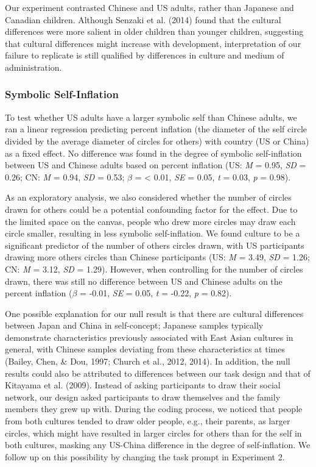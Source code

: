 \documentclass[
  man,floatsintext]{apa6}
\begin{document}
Our experiment contrasted Chinese and US adults, rather than Japanese and Canadian children. Although Senzaki et al. (2014) found that the cultural differences were more salient in older children than younger children, suggesting that cultural differences might increase with development, interpretation of our failure to replicate is still qualified by differences in culture and medium of administration.

\hypertarget{symbolic-self-inflation-1}{%
\subsubsection{Symbolic Self-Inflation}\label{symbolic-self-inflation-1}}

To test whether US adults have a larger symbolic self than Chinese adults, we ran a linear regression predicting percent inflation (the diameter of the self circle divided by the average diameter of circles for others) with country (US or China) as a fixed effect. No difference was found in the degree of symbolic self-inflation between US and Chinese adults based on percent inflation (US: \emph{M} = 0.95, \emph{SD} = 0.26; CN: \emph{M} = 0.94, \emph{SD} = 0.53; \(\beta\) = \textless{} 0.01, \emph{SE} = 0.05, \emph{t} = 0.03, \emph{p} = 0.98).

As an exploratory analysis, we also considered whether the number of circles drawn for others could be a potential confounding factor for the effect. Due to the limited space on the canvas, people who drew more circles may draw each circle smaller, resulting in less symbolic self-inflation. We found culture to be a significant predictor of the number of others circles drawn, with US participants drawing more others circles than Chinese participants (US: \emph{M} = 3.49, \emph{SD} = 1.26; CN: \emph{M} = 3.12, \emph{SD} = 1.29). However, when controlling for the number of circles drawn, there was still no difference between US and Chinese adults on the percent inflation (\(\beta\) = -0.01, \emph{SE} = 0.05, \emph{t} = -0.22, \emph{p} = 0.82).

One possible explanation for our null result is that there are cultural differences between Japan and China in self-concept; Japanese samples typically demonstrate characteristics previously associated with East Asian cultures in general, with Chinese samples deviating from these characteristics at times (Bailey, Chen, \& Dou, 1997; Church et al., 2012, 2014). In addition, the null results could also be attributed to differences between our task design and that of Kitayama et al. (2009). Instead of asking participants to draw their social network, our design asked participants to draw themselves and the family members they grew up with. During the coding process, we noticed that people from both cultures tended to draw older people, e.g., their parents, as larger circles, which might have resulted in larger circles for others than for the self in both cultures, masking any US-China difference in the degree of self-inflation. We follow up on this possibility by changing the task prompt in Experiment 2.
\end{document}
